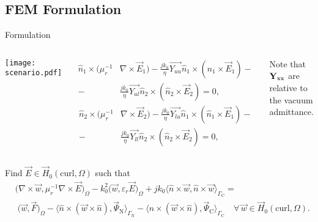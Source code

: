 %
%

\subsection{FEM Formulation}

\begin{frame}[allowframebreaks]{Formulation}
  \begin{columns}
     \centering
    {\texttt{[image: scenario.pdf]}}
    {
      \begin{align*}
        \hat{n}_1\times(\mu_r^{-1}&\nabla\times\vec{E}_1) - \frac{jk_0}{\eta}\vec{Y_{uu}}\hat{n}_1\times(\hat{n}_1\times\vec{E}_1) - \\
        - &\frac{jk_0}{\eta}\vec{Y_{ul}}\hat{n}_2\times(\hat{n}_2\times\vec{E}_2) = 0,
      \end{align*}
      \begin{align*}
        \hat{n}_2\times(\mu_r^{-1}&\nabla\times\vec{E}_2) - \frac{jk_0}{\eta}\vec{Y_{lu}}\hat{n}_1\times(\hat{n}_1\times\vec{E}_1) - \\
        - &\frac{jk_0}{\eta}\vec{Y_{ll}}\hat{n}_2\times(\hat{n}_2\times\vec{E}_2) = 0,
      \end{align*}

      \alert{Note that $\vec{Y}_{\rm xx}$ are relative to the vacuum admittance.}
    }
  \end{columns}

  \framebreak %

  Find $\vec{E} \in \vec{H}_0(\text{curl},\Omega)$ such that
  \begin{align*}
    &\Big(\nabla\times\vec{w},\mu_r^{-1}\nabla\times\vec{E} \Big)_\Omega - k_0^2\Big(\vec{w},\varepsilon_r\vec{E} \Big)_\Omega + 
    jk_0\Big\langle\hat{n}\times\vec{w},\hat{n}\times\vec{w}\Big\rangle_{\Gamma_{\text{C}}} = \\
    &\;\Big(\vec{w},\vec{F}\Big)_\Omega - 
    \Big\langle\hat{n}\times(\vec{w}\times\hat{n}),\vec{\Psi}_{\text{N}}\Big\rangle_{\Gamma_{\text{N}}} -
    \Big\langle\hat{n}\times(\vec{w}\times\hat{n}),\vec{\Psi}_{\text{C}}\Big\rangle_{\Gamma_{\text{C}}}
    \quad \forall \,\vec{w} \in \vec{H}_0(\text{curl},\Omega).
  \end{align*}
  

\end{frame}
